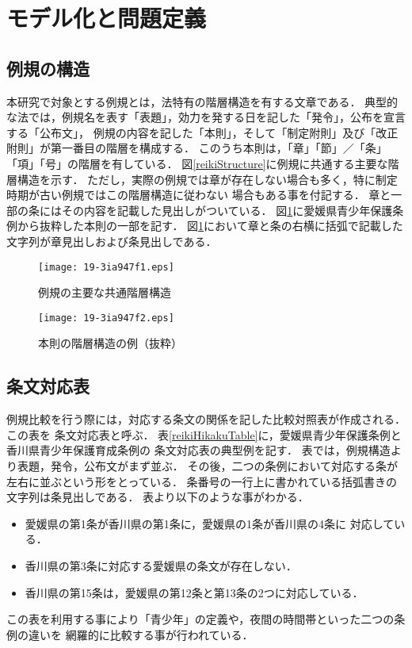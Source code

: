 \documentclass[japanese]{jnlp_1.4}
\begin{document}
\section{モデル化と問題定義}
\label{sec:definition}

\subsection{例規の構造}

本研究で対象とする例規とは，法特有の階層構造を有する文章である．
典型的な法では，例規名を表す「表題」，効力を発する日を記した「発令」，公布を宣言する「公布文」，
例規の内容を記した「本則」，そして「制定附則」及び「改正附則」が第一番目の階層を構成する．
このうち本則は，「章」「節」／「条」「項」「号」の階層を有している．
図\ref{reikiStructure}に例規に共通する主要な階層構造を示す．
ただし，実際の例規では章が存在しない場合も多く，特に制定時期が古い例規ではこの階層構造に従わない
場合もある事を付記する．
章と一部の条にはその内容を記載した見出しがついている．
図\ref{reikiExample}に愛媛県青少年保護条例から抜粋した本則の一部を記す．
図\ref{reikiExample}において章と条の右横に括弧で記載した文字列が章見出しおよび条見出しである．

\begin{figure}[t]
\noindent\begin{minipage}[b]{171.5pt}
\begin{center}
\texttt{[image: 19-3ia947f1.eps]}
\end{center}
\caption{例規の主要な共通階層構造}
\label{reikiStructure}
\end{minipage}
\begin{minipage}[b]{248.5pt}
\begin{center}
\texttt{[image: 19-3ia947f2.eps]}
\caption{本則の階層構造の例（抜粋）}
\label{reikiExample}
\end{center}
\end{minipage}
\end{figure}


\subsection{条文対応表}\label{sec:taiouhyou}

例規比較を行う際には，対応する条文の関係を記した比較対照表が作成される．この表を
条文対応表と呼ぶ．
表\ref{reikiHikakuTable}に，愛媛県青少年保護条例と香川県青少年保護育成条例の
条文対応表の典型例を記す．
表では，例規構造より表題，発令，公布文がまず並ぶ．
その後，二つの条例において対応する条が左右に並ぶという形をとっている．
条番号の一行上に書かれている括弧書きの文字列は条見出しである．
表より以下のような事がわかる．
\begin{itemize}
\item 愛媛県の第1条が香川県の第1条に，愛媛県の1条が香川県の4条に
対応している．
\item 香川県の第3条に対応する愛媛県の条文が存在しない．
\item 香川県の第15条は，愛媛県の第12条と第13条の2つに対応している．
\end{itemize}
この表を利用する事により「青少年」の定義や，夜間の時間帯といった二つの条例の違いを
網羅的に比較する事が行われている．
\end{document}
